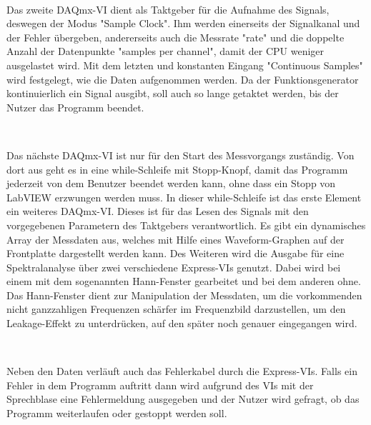 \

Das zweite DAQmx-VI dient als Taktgeber für die Aufnahme des Signals, deswegen der Modus "Sample Clock".
Ihm werden einerseits der Signalkanal und der Fehler übergeben, andererseits auch die Messrate "rate" und die doppelte Anzahl der Datenpunkte "samples per channel", damit der CPU weniger ausgelastet wird. 
Mit dem letzten und konstanten Eingang "Continuous Samples" wird festgelegt, wie die Daten aufgenommen werden.
Da der Funktionsgenerator kontinuierlich ein Signal ausgibt, soll auch so lange getaktet werden, bis der Nutzer das Programm beendet.
	
\

Das nächste DAQmx-VI ist nur für den Start des Messvorgangs zuständig.
Von dort aus geht es in eine while-Schleife mit Stopp-Knopf, damit das Programm jederzeit von dem Benutzer beendet werden kann, ohne dass ein Stopp von LabVIEW erzwungen werden muss.
In dieser while-Schleife ist das erste Element ein weiteres DAQmx-VI.
Dieses ist für das Lesen des Signals mit den vorgegebenen Parametern des Taktgebers verantwortlich.
Es gibt ein dynamisches Array der Messdaten aus, welches mit Hilfe eines Waveform-Graphen auf der Frontplatte dargestellt werden kann.  
Des Weiteren wird die Ausgabe für eine Spektralanalyse über zwei verschiedene Express-VIs genutzt. 
Dabei wird bei einem mit dem sogenannten Hann-Fenster gearbeitet und bei dem anderen ohne.
Das Hann-Fenster dient zur Manipulation der Messdaten, um die vorkommenden nicht ganzzahligen Frequenzen schärfer im Frequenzbild darzustellen, um den Leakage-Effekt zu unterdrücken, auf den später noch genauer eingegangen wird.
	
\

Neben den Daten verläuft auch das Fehlerkabel durch die Express-VIs. 
Falls ein Fehler in dem Programm auftritt dann wird aufgrund des VIs mit der Sprechblase eine Fehlermeldung ausgegeben und der Nutzer wird gefragt, ob das Programm weiterlaufen oder gestoppt werden soll.
	
\

